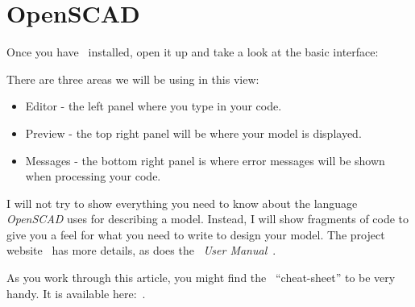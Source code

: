 \section{OpenSCAD}

Once you have \osc\ installed, open it up and take a look at the basic
interface:


There are three areas we will be using in this view:

\begin{itemize}
\item{Editor - the left panel where you type in your code.}
\item{Preview - the top right panel will be where your model is displayed.}
\item{Messages - the bottom right panel is where error messages will be shown
when processing your code.}
\end{itemize}

I will not try to show everything you need to know about the language {\it
OpenSCAD} uses for describing a model. Instead, I will show fragments of code
to give you a feel for what you need to write to design your model. The project
website~\cite{blackr} has more details, as does the \osc\ {\it User
Manual}~\cite{userman}.

As you work through this article, you might find the \osc\ ``cheat-sheet'' to
be very handy. It is available here:~\cite{osccheat}.

